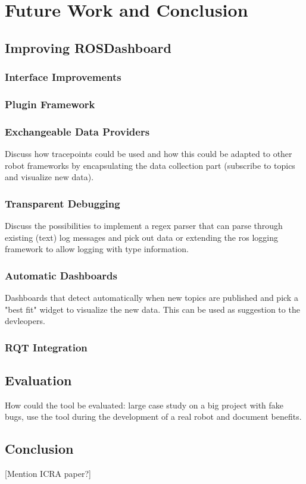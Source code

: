 \chapter{Future Work and Conclusion}
\label{future_work}

\section{Improving ROSDashboard}
\subsection{Interface Improvements}
\subsection{Plugin Framework}
\subsection{Exchangeable Data Providers}
Discuss how tracepoints could be used and how this could be adapted to other robot frameworks by encapsulating the data collection part (subscribe to topics and visualize new data).
\subsection{Transparent Debugging}
Discuss the possibilities to implement a regex parser that can parse through existing (text) log messages and pick out data or extending the ros logging framework to allow logging with type information.
\subsection{Automatic Dashboards}
Dashboards that detect automatically when new topics are published and pick a "best fit" widget to visualize the new data. This can be used as suggestion to the devleopers.
\subsection{RQT Integration}

\section{Evaluation}
How could the tool be evaluated: large case study on a big project with fake bugs, use the tool during the development of a real robot and document benefits.

\section{Conclusion}

[Mention ICRA paper?]
